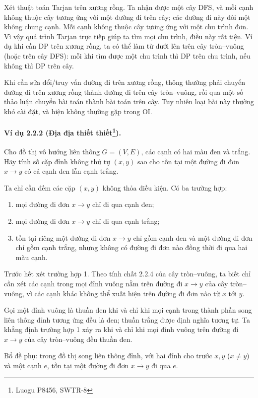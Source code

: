 \documentclass[11pt]{article}
\renewcommand{\leadsto}{\mathrel{\longrightarrow}}
\begin{document}
Xét thuật toán Tarjan trên xương rồng. Ta nhận được một cây DFS, và mỗi cạnh
không thuộc cây tương ứng với một đường đi trên cây; các đường đi này đôi một
không chung cạnh. Mỗi cạnh không thuộc cây tương ứng với một chu trình đơn. Vì
vậy quá trình Tarjan trực tiếp giúp ta tìm mọi chu trình, điều này rất tiện. Ví
dụ khi cần DP trên xương rồng, ta có thể làm từ dưới lên trên cây tròn--vuông
(hoặc trên cây DFS): mỗi khi tìm được một chu trình thì DP trên chu trình, nếu
không thì DP trên cây.

Khi cần sửa đổi/truy vấn đường đi trên xương rồng, thông thường phải chuyển
đường đi trên xương rồng thành đường đi trên cây tròn--vuông, rồi qua một số
thảo luận chuyển bài toán thành bài toán trên cây. Tuy nhiên loại bài này thường
khó cài đặt, và hiện không thường gặp trong OI.

\paragraph{Ví dụ 2.2.2 (Địa địa thiết thiết\protect\footnote{Luogu P8456, SWTR-8}).}
Cho đồ thị vô hướng liên thông $G=(V,E)$, các cạnh có hai màu đen và trắng. Hãy
tính số cặp đỉnh không thứ tự $(x,y)$ sao cho tồn tại một đường đi đơn
$x\leadsto y$ có cả cạnh đen lẫn cạnh trắng.

Ta chỉ cần đếm các cặp $(x,y)$ không thỏa điều kiện. Có ba trường hợp:
\begin{enumerate}
  \item mọi đường đi đơn $x\leadsto y$ chỉ đi qua cạnh đen;
  \item mọi đường đi đơn $x\leadsto y$ chỉ đi qua cạnh trắng;
  \item tồn tại riêng một đường đi đơn $x\leadsto y$ chỉ gồm cạnh đen và một
  đường đi đơn chỉ gồm cạnh trắng, nhưng không có đường đi đơn nào đồng thời đi
  qua hai màu cạnh.
\end{enumerate}

Trước hết xét trường hợp 1. Theo tính chất 2.2.4 của cây tròn--vuông, ta biết
chỉ cần xét các cạnh trong mọi đỉnh vuông nằm trên đường đi $x\leadsto y$ của
cây tròn--vuông, vì các cạnh khác không thể xuất hiện trên đường đi đơn nào từ
$x$ tới $y$.

Gọi một đỉnh vuông là thuần đen khi và chỉ khi mọi cạnh trong thành phần song
liên thông đỉnh tương ứng đều là đen; thuần trắng được định nghĩa tương tự. Ta
khẳng định trường hợp 1 xảy ra khi và chỉ khi mọi đỉnh vuông trên đường đi
$x\leadsto y$ của cây tròn--vuông đều thuần đen.

Bổ đề phụ: trong đồ thị song liên thông đỉnh, với hai đỉnh cho trước
$x,y$ ($x\ne y$) và một cạnh $e$, tồn tại một đường đi đơn $x\leadsto y$ đi qua
$e$.
\end{document}
